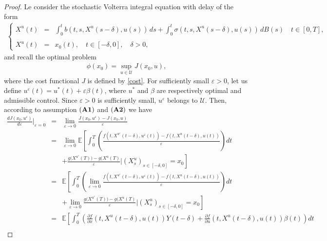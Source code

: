 \documentclass[12pt]{article}
\theoremstyle{remark}
\numberwithin{equation}{section}
\begin{document}
\begin{proof}
Le consider the stochastic Volterra integral equation with delay of the form
\begin{eqnarray*}
\left\{
\begin{array}{lll}
 X^{u}(t) & =& \displaystyle \int_{0}^{t}b(t,s,X^{u}(s-\delta),u(s))\,ds +\int_{0}^{t}\sigma(t,s,X^{u}(s-\delta),u(s))\,dB(s)	 
\quad t \in [0,T],\\\\	
X^{u}(t)& =& x_{0}(t), \quad t \in [-\delta, 0],\quad \delta >0,
\end{array}
\right.
\end{eqnarray*}
and recall the optimal problem
\begin{eqnarray*}
\phi(x_{0})=\sup_{u \in \mathcal{U}} J(x_0,u),
\end{eqnarray*}
where the cost functional $J$ is defined by \eqref{cost}.
For sufficiently small $\varepsilon>0$, let us define $u^{\varepsilon}(t) = u^{*}(t) + \varepsilon \beta(t)$, where $u^{*}$ and $\beta$ are respectively optimal and admissible control. Since $\varepsilon>0$ is sufficiently small, $u^{\varepsilon}$ belongs to  $\mathcal{U}$.
Then, according to assumption $({\bf A1})$ and $({\bf A2})$ we have 
\begin{eqnarray}\label{CF}
\frac{dJ(x_0,u^{\varepsilon})}{d\varepsilon}|_{\varepsilon=0}&=&\lim_{\varepsilon \rightarrow 0}\frac{J(x_0,u^{\varepsilon})-J(x_0,u)}{\varepsilon}\nonumber\\
&=&\lim_{\varepsilon\rightarrow 0}\mathbb{E}\left[\int_{0}^{T}\left(\frac{f(t,X^{u^\varepsilon}(t-\delta),u^{\varepsilon}(t))-f(t,X^{u}(t-\delta),u(t))}{\varepsilon}\right)dt\right.\nonumber\\
&&\left.+\frac{g\big(X^{u^{\varepsilon}}(T)\big)-g\big(X^{u}(T)}{\varepsilon}\Big|(X^{u}_s)_{s\in[-\delta,0]}=x_0\right]\nonumber\\
&=& \mathbb{E}\left[\int_{0}^{T}\left(\lim_{\varepsilon\rightarrow 0}\frac{f(t,X^{u^\varepsilon}(t-\delta),u^{\varepsilon}(t))-f(t,X^{u}(t-\delta),u(t))}{\varepsilon}\right)dt\right.\nonumber\\
&&\left.+\lim_{\varepsilon\rightarrow 0}\frac{g\big(X^{u^{\varepsilon}}(T)\big)-g\big(X^{u}(T)}{\varepsilon}\Big|(X^{u}_s)_{s\in[-\delta,0]}=x_0\right]\nonumber\\
&=& \mathbb{E}\left[\int_{0}^{T}\left(\frac{\partial f}{\partial x}(t,X^{u}(t-\delta),u(t))Y(t-\delta)+\frac{\partial f}{\partial u}(t,X^{u}(t-\delta),u(t))\beta(t)\right)dt\right.\nonumber\\

\end{eqnarray}
\end{proof}
\end{document}
